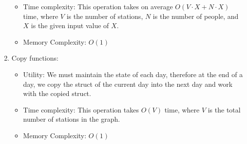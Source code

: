 \documentclass{article}
\begin{document}
\begin{enumerate}
{\begin{itemize}
		At the end of each day, we also copy the current day struct into the next day struct to have a state table of the changes on each day and traverse through all the people to print primary and secondary contacts of the people on the list $L$.
		\item Time complexity:
		This operation takes on average $O(V\cdot X + N\cdot X)$ time, where $V$ is the number of stations, $N$ is the number of people, and $X$ is the given input value of $X$.
		\item Memory Complexity: $O(1)$
    \end{itemize}
	}
	\item Copy functions: 
	{\begin{itemize}
        \item Utility: We must maintain the state of each day, therefore at the end of a day, we copy the struct of the current day into the next day and work with the copied struct.
		\item Time complexity: This operation takes $O(V)$ time, where $V$ is the total number of stations in the graph.
	    \item Memory Complexity: $O(1)$
    \end{itemize}
	}
\end{enumerate}
\newpage
\end{document}
